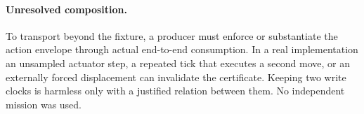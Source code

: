 \documentclass{article}
\begin{document}
\paragraph{Unresolved composition.}
To transport beyond the fixture, a producer must enforce or substantiate
the action envelope through actual end-to-end consumption. In a real
implementation an unsampled actuator step, a repeated tick that executes
a second move, or an externally forced displacement can invalidate the
certificate. Keeping two write clocks is harmless only with a justified
relation between them. No independent mission was used.
\end{document}
